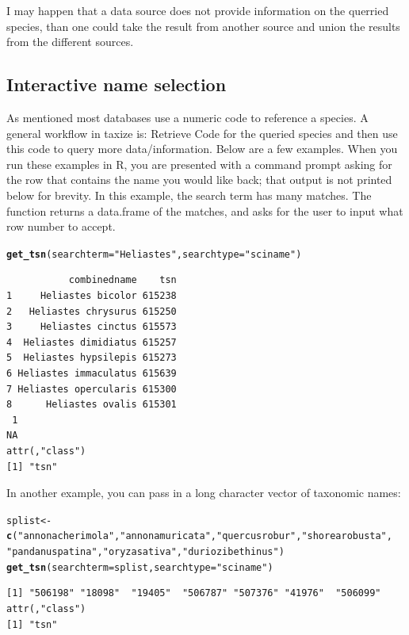 \documentclass[10pt]{article}\usepackage[]{graphicx}\usepackage[]{color}
\makeatletter
\newcommand{\hlfunctioncall}[1]{\textcolor[rgb]{0.501960784313725,0,0.329411764705882}{\textbf{#1}}}%
\newcommand{\hlstring}[1]{\textcolor[rgb]{0.6,0.6,1}{#1}}%
\newenvironment{kframe}{%
 \def\at@end@of@kframe{}%
 \ifinner\ifhmode%
  \def\at@end@of@kframe{\end{minipage}}%
  \begin{minipage}{\columnwidth}%
 \fi\fi%
 \def\FrameCommand##1{\hskip\@totalleftmargin \hskip-\fboxsep
 \colorbox{shadecolor}{##1}\hskip-\fboxsep
     \hskip-\linewidth \hskip-\@totalleftmargin \hskip\columnwidth}%
 \MakeFramed {\advance\hsize-\width
   \@totalleftmargin\z@ \linewidth\hsize
   \@setminipage}}%
 {\par\unskip\endMakeFramed%
 \at@end@of@kframe}
\newenvironment{knitrout}{}{} %
\makeatother
\begin{document}
I may happen that a data source does not provide information on the querried species, than one could take the result from another source and union the results from the different sources.

\subsection*{Interactive name selection}
As mentioned most databases use a numeric code to reference a species. A general workflow in taxize is: Retrieve Code for the queried species and then use this code to query more data/information.
Below are a few examples. When you run these examples in R, you are presented with a command prompt asking for the row that contains the name you would like back; that output is not printed below for brevity. In this example, the search term has many matches. The function returns a data.frame of the matches, and asks for the user to input what row number to accept. 

\begin{knitrout}
\color{fgcolor}\begin{kframe}
\begin{alltt}
\hlfunctioncall{get_tsn}(searchterm = \hlstring{"Heliastes"}, searchtype = \hlstring{"sciname"})
\end{alltt}
\begin{verbatim}
           combinedname    tsn
1     Heliastes bicolor 615238
2   Heliastes chrysurus 615250
3     Heliastes cinctus 615573
4  Heliastes dimidiatus 615257
5  Heliastes hypsilepis 615273
6 Heliastes immaculatus 615639
7 Heliastes opercularis 615300
8      Heliastes ovalis 615301
 1 
NA 
attr(,"class")
[1] "tsn"
\end{verbatim}
\end{kframe}
\end{knitrout}


In another example, you can pass in a long character vector of taxonomic names:

\begin{knitrout}
\color{fgcolor}\begin{kframe}
\begin{alltt}
splist <- \hlfunctioncall{c}(\hlstring{"annona cherimola"}, \hlstring{"annona muricata"}, \hlstring{"quercus robur"}, \hlstring{"shorea robusta"}, 
    \hlstring{"pandanus patina"}, \hlstring{"oryza sativa"}, \hlstring{"durio zibethinus"})
\hlfunctioncall{get_tsn}(searchterm = splist, searchtype = \hlstring{"sciname"})
\end{alltt}
\begin{verbatim}
[1] "506198" "18098"  "19405"  "506787" "507376" "41976"  "506099"
attr(,"class")
[1] "tsn"
\end{verbatim}
\end{kframe}
\end{knitrout}
\end{document}
